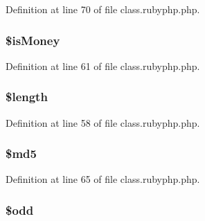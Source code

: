 Definition at line 70 of file class.\-rubyphp.\-php.

\hypertarget{class_pierce_moore_1_1_ruby_p_h_p_1_1r_aa2f5c87cc7b1ab41965e940d5c1406d9}{
\subsubsection[{\$is\-Money}]{\setlength{\rightskip}{0pt plus 5cm}\$is\-Money}}\label{class_pierce_moore_1_1_ruby_p_h_p_1_1r_aa2f5c87cc7b1ab41965e940d5c1406d9}


Definition at line 61 of file class.\-rubyphp.\-php.

\hypertarget{class_pierce_moore_1_1_ruby_p_h_p_1_1r_adf14d8e29912c1855022dfa252aa4087}{
\subsubsection[{\$length}]{\setlength{\rightskip}{0pt plus 5cm}\${\bf length}}}\label{class_pierce_moore_1_1_ruby_p_h_p_1_1r_adf14d8e29912c1855022dfa252aa4087}


Definition at line 58 of file class.\-rubyphp.\-php.

\hypertarget{class_pierce_moore_1_1_ruby_p_h_p_1_1r_a2557b214f57a046187b88572e443da1f}{
\subsubsection[{\$md5}]{\setlength{\rightskip}{0pt plus 5cm}\${\bf md5}}}\label{class_pierce_moore_1_1_ruby_p_h_p_1_1r_a2557b214f57a046187b88572e443da1f}


Definition at line 65 of file class.\-rubyphp.\-php.

\hypertarget{class_pierce_moore_1_1_ruby_p_h_p_1_1r_aee2d4fa4e98da4e6ad23bee644ab5e7a}{
\subsubsection[{\$odd}]{\setlength{\rightskip}{0pt plus 5cm}\${\bf odd}}}\label{class_pierce_moore_1_1_ruby_p_h_p_1_1r_aee2d4fa4e98da4e6ad23bee644ab5e7a}


